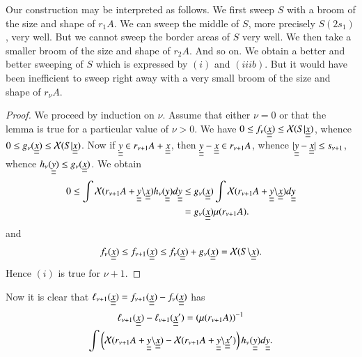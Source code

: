Our construction may be interpreted as follows. We first sweep $S$ with a broom of the size and shape of $r_{1}A$. We can sweep the middle of $S$, more precisely $S(2s_{1})$, very well. But we cannot sweep the border areas of $S$ very well. We then take a smaller broom of the size and shape of $r_{2} A$. And so on. We obtain a better and better sweeping of $S$ which is expressed by $(i)$ and $(iiib)$. But it would have been inefficient to sweep right away with a very small broom of the size and shape of $r_{\nu} A$.

\begin{proof} 
We proceed by induction on $\nu$. Assume that either $\nu = 0$ or that the lemma is true for a particular value of $\nu > 0$. We have $0 \leq f_{\nu} (\underline{\underline{x}}) \leq \mathcal{X}(S | \underline{\underline{x}})$, whence $0 \leq g_{\nu} (\underline{\underline{x}}) \leq \mathcal{X}(S | \underline{\underline{x}})$. Now if $\underline{\underline{y}} \in r_{\nu+1} A + \underline{\underline{x}}$, then $\underline{\underline{y}} - \underline{\underline{x}} \in r_{\nu+1} A$, whence $|\underline{\underline{y}} - \underline{\underline{x}}| \leq s_{\nu+1}$, whence $h_{\nu} (\underline{\underline{y}}) \leq g_{\nu}(\underline{\underline{x}})$. We obtain
\begin{align*}
0 \leq \int \mathcal{X} (r_{\nu+1} A + \underline{\underline{y}}\backslash \underline{\underline{x}}) h_{\nu} (\underline{\underline{y}}) d\underline{\underline{y}} & \leq g_{\nu}(\underline{\underline{x}}) \int \mathcal{X} (r_{\nu+1} A + \underline{\underline{y}}\backslash \underline{\underline{x}}) d\underline{\underline{y}}\\
& = g_{\nu} (\underline{\underline{x}}) \mu(r_{\nu+1} A).
\end{align*}
and\pageoriginale
$$
f_{\nu} (\underline{\underline{x}}) \leq f_{\nu+1} (\underline{\underline{x}}) \leq f_{\nu} (\underline{\underline{x}}) + g_{\nu} (\underline{\underline{x}}) = \mathcal{X}(S \backslash \underline{\underline{x}}).
$$
Hence $(i)$ is true for $\nu + 1$.
\end{proof}

Now it is clear that $\ell_{\nu+1} (\underline{\underline{x}}) = f_{\nu+1}(\underline{\underline{x}}) - f_{\nu}(\underline{\underline{x}})$ has
\begin{multline*}
\ell_{\nu+1} (\underline{\underline{x}}) - \ell_{\nu+1} (\underline{\underline{x}}') = (\mu(r_{\nu+1} A))^{-1}\\ \int\left(\mathcal{X} (r_{\nu+1} A + \underline{\underline{y}} \backslash \underline{\underline{x}}) - \mathcal{X} (r_{\nu+1} A + \underline{\underline{y}} \backslash \underline{\underline{x}}')\right) h_{\nu} (\underline{\underline{y}}) d\underline{\underline{y}}.
\end{multline*}

